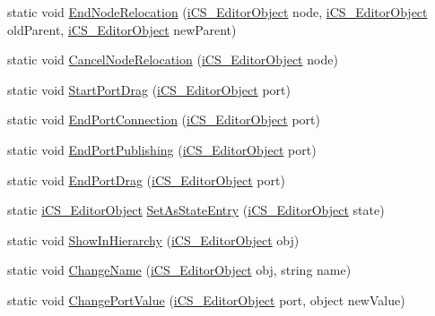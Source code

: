 \begin{DoxyCompactItemize}
\item 
static void \hyperlink{classi_c_s___user_commands_a97f978929a07f60b01d80cac7516d383}{End\+Node\+Relocation} (\hyperlink{classi_c_s___editor_object}{i\+C\+S\+\_\+\+Editor\+Object} node, \hyperlink{classi_c_s___editor_object}{i\+C\+S\+\_\+\+Editor\+Object} old\+Parent, \hyperlink{classi_c_s___editor_object}{i\+C\+S\+\_\+\+Editor\+Object} new\+Parent)
\item 
static void \hyperlink{classi_c_s___user_commands_ac5399df09128a3032adfe334dea8c348}{Cancel\+Node\+Relocation} (\hyperlink{classi_c_s___editor_object}{i\+C\+S\+\_\+\+Editor\+Object} node)
\item 
static void \hyperlink{classi_c_s___user_commands_a6125d8627c927400b8bc67a7deb77fe4}{Start\+Port\+Drag} (\hyperlink{classi_c_s___editor_object}{i\+C\+S\+\_\+\+Editor\+Object} port)
\item 
static void \hyperlink{classi_c_s___user_commands_aa842d00564fe7dcc8fe3a66afef6118f}{End\+Port\+Connection} (\hyperlink{classi_c_s___editor_object}{i\+C\+S\+\_\+\+Editor\+Object} port)
\item 
static void \hyperlink{classi_c_s___user_commands_a4db856b4bfcbe663f123976d244797b3}{End\+Port\+Publishing} (\hyperlink{classi_c_s___editor_object}{i\+C\+S\+\_\+\+Editor\+Object} port)
\item 
static void \hyperlink{classi_c_s___user_commands_a4fb22a7475e6fbef4b712dc38dc5ba87}{End\+Port\+Drag} (\hyperlink{classi_c_s___editor_object}{i\+C\+S\+\_\+\+Editor\+Object} port)
\item 
static \hyperlink{classi_c_s___editor_object}{i\+C\+S\+\_\+\+Editor\+Object} \hyperlink{classi_c_s___user_commands_a8705512c8102699ed44f53b474df50f5}{Set\+As\+State\+Entry} (\hyperlink{classi_c_s___editor_object}{i\+C\+S\+\_\+\+Editor\+Object} state)
\item 
static void \hyperlink{classi_c_s___user_commands_a7a810497916e6e6597a95f31e1347fce}{Show\+In\+Hierarchy} (\hyperlink{classi_c_s___editor_object}{i\+C\+S\+\_\+\+Editor\+Object} obj)
\item 
static void \hyperlink{classi_c_s___user_commands_afd94efbcdbd96959e4f40d279c210d01}{Change\+Name} (\hyperlink{classi_c_s___editor_object}{i\+C\+S\+\_\+\+Editor\+Object} obj, string name)
\item 
static void \hyperlink{classi_c_s___user_commands_a591ab96af917a19d33b96663acb7cf46}{Change\+Port\+Value} (\hyperlink{classi_c_s___editor_object}{i\+C\+S\+\_\+\+Editor\+Object} port, object new\+Value)
\item 

\end{DoxyCompactItemize}
